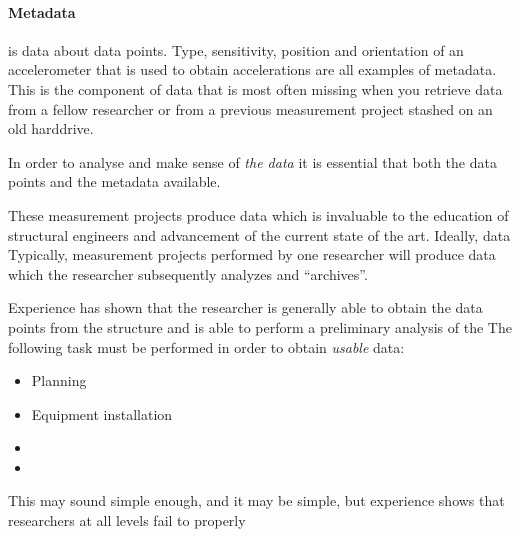 \documentclass{article}
\begin{document}
\paragraph{Metadata} is data about data points.  Type, sensitivity, position and orientation of an accelerometer that is used to obtain accelerations are all examples of metadata.  This is the component of data that is most often missing when you retrieve data from a fellow researcher or from a previous measurement project stashed on an old harddrive.

In order to analyse and make sense of \emph{the data} it is essential that both the data points and the metadata available.



These measurement projects produce data which is invaluable to the education of structural engineers and advancement of the current state of the art.  Ideally, data  Typically, measurement projects performed by one researcher will produce data which the researcher subsequently analyzes and ``archives''.

Experience has shown that the researcher is generally able to obtain the data points from the structure and is able to perform a preliminary analysis of the  The following task
must be performed in order to obtain \emph{usable} data:

\begin{itemize}
\item Planning
\item Equipment installation
\item
\item
\end{itemize}

This may sound simple enough, and it may be simple, but experience shows that researchers at all levels fail to properly
\end{document}
